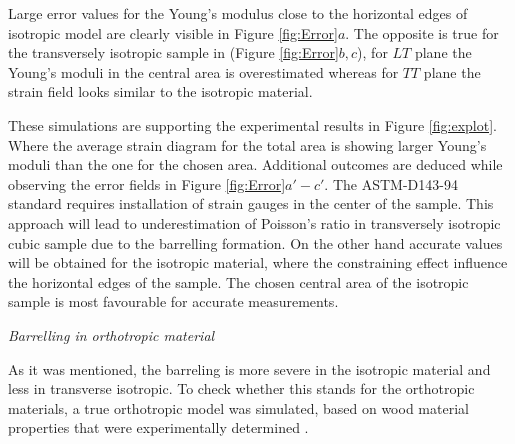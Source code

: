 \documentclass[review]{elsarticle}
\begin{document}
Large error values for the Young's
modulus close to the horizontal edges of isotropic model are clearly visible in
Figure \ref{fig:Error}$a$. The opposite is true for the transversely isotropic
sample in (Figure \ref{fig:Error}$b,c$), for $LT$ plane 
the Young's moduli in the central area is overestimated whereas for $TT$ plane
the strain field looks similar to the isotropic material.\par
These simulations are supporting the experimental results in Figure
\ref{fig:explot}. Where the average strain diagram for the total area is showing larger Young's moduli than
the one for the chosen area.
Additional outcomes are deduced  while observing the error fields in Figure
\ref{fig:Error}$a'-c'$. The ASTM-D143-94 standard \cite{american2009standard} requires
installation of strain gauges in the center of the sample. This approach will
lead to underestimation of Poisson's ratio in transversely isotropic cubic
sample due to the barrelling formation. On the other hand accurate values will
be obtained for the isotropic material, where the constraining effect influence
the horizontal edges of the sample. The chosen central area of the isotropic
sample is most favourable for accurate measurements.


\begin{description}
\item{\textit{Barrelling in orthotropic material}}
\end{description}
As it was mentioned, the barreling is more severe in the isotropic material and
less in transverse isotropic. To check whether this stands for the orthotropic
materials, a true orthotropic model was simulated, based on wood material properties
that were experimentally determined \cite{vorobyevcharacterisation}. \par
\end{document}
